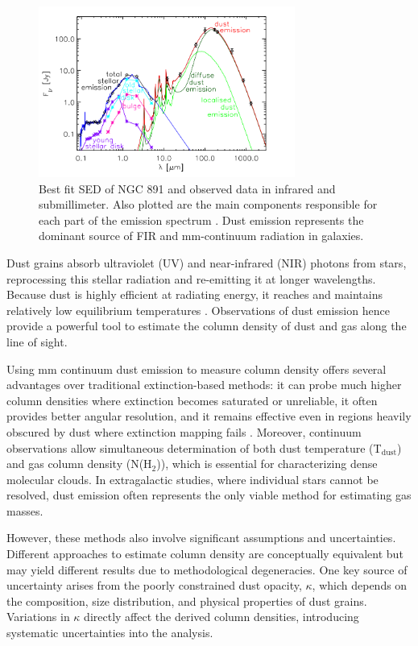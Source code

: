 \begin{figure}
    \centering
    \includegraphics[width=0.75\textwidth]{figures/dust_emission_blackbody.png}
    \caption{Best fit SED of NGC 891 and observed data in infrared and submillimeter. Also plotted are the main components responsible for each part of the emission spectrum \cite{popescu2011modelling}. Dust emission represents the dominant source of FIR and mm-continuum radiation in galaxies.}
    \label{fig:dust_emission_blackbody}
\end{figure}

Dust grains absorb ultraviolet (UV) and near-infrared (NIR) photons from stars, reprocessing this stellar radiation and re-emitting it at longer wavelengths. 
Because dust is highly efficient at radiating energy, it reaches and maintains relatively low equilibrium temperatures \cite{hildebrand1983determination}. 
Observations of dust emission hence provide a powerful tool to estimate the column density of dust and gas along the line of sight.

Using mm continuum dust emission to measure column density offers several advantages over traditional extinction-based methods: it can probe much higher column densities where extinction becomes saturated or unreliable, it often provides better angular resolution, and it remains effective even in regions heavily obscured by dust where extinction mapping fails \cite{draine2003interstellar}. Moreover, continuum observations allow simultaneous determination of both dust temperature (T$_{\mathrm{dust}}$) and gas column density (N(H$_2$)), which is essential for characterizing dense molecular clouds. In extragalactic studies, where individual stars cannot be resolved, dust emission often represents the only viable method for estimating gas masses.

However, these methods also involve significant assumptions and uncertainties. Different approaches to estimate column density are conceptually equivalent but may yield different results due to methodological degeneracies. One key source of uncertainty arises from the poorly constrained dust opacity, $\kappa$, which depends on the composition, size distribution, and physical properties of dust grains. Variations in $\kappa$ directly affect the derived column densities, introducing systematic uncertainties into the analysis.

